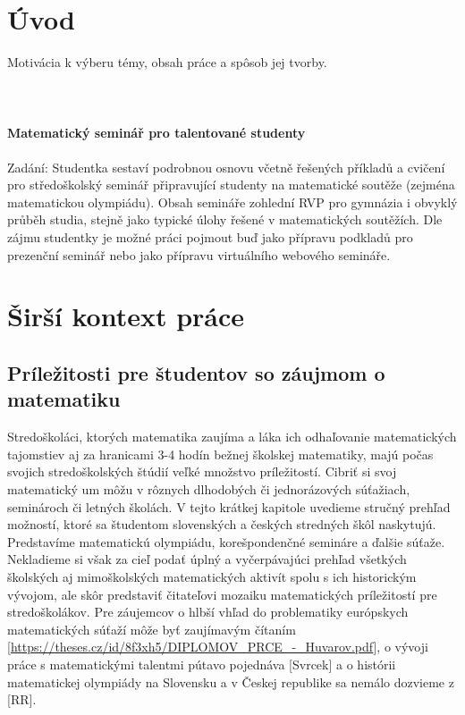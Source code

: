 \documentclass[11pt,a4paper,oneside,final]{book}
\begin{document}
\tableofcontents



\chapter*{Úvod}
\label{chap:intro}

Motivácia k výberu témy, obsah práce a spôsob jej tvorby.\\
\\
\\
\\
\textbf{Matematický seminář pro talentované studenty}\\
\\
Zadání: Studentka sestaví podrobnou osnovu včetně řešených příkladů a cvičení pro středoškolský seminář připravující studenty na matematické soutěže (zejména matematickou olympiádu). Obsah semináře zohlední RVP pro gymnázia i obvyklý průběh studia, stejně jako typické úlohy řešené v matematických soutěžích. Dle zájmu studentky je možné práci pojmout buď jako přípravu podkladů pro prezenční seminář nebo jako přípravu virtuálního webového semináře.

\chapter{Širší kontext práce}
\section{Príležitosti pre študentov so záujmom o matematiku}

Stredoškoláci, ktorých matematika zaujíma a láka ich odhaľovanie matematických tajomstiev aj za hranicami 3-4 hodín bežnej školskej matematiky, majú počas svojich stredoškolských štúdií veľké množstvo príležitostí. Cibriť si svoj matematický um môžu v rôznych dlhodobých či jednorázových súťažiach, seminároch či letných školách. V tejto krátkej kapitole uvedieme stručný prehľad možností, ktoré sa študentom slovenských a českých stredných škôl naskytujú. Predstavíme matematickú olympiádu, korešpondenčné semináre a ďalšie súťaže. Nekladieme si však za cieľ podať úplný a vyčerpávajúci prehľad všetkých školských aj mimoškolských matematických aktivít spolu s ich historickým vývojom, ale skôr predstaviť čitateľovi mozaiku matematických príležitostí pre stredoškolákov. Pre záujemcov o hlbší vhľad do problematiky európskych matematických súťaží môže byť zaujímavým čítaním [\url{https://theses.cz/id/8f3xh5/DIPLOMOV_PRCE_-_Huvarov.pdf}], o vývoji práce s matematickými talentmi pútavo pojednáva [Svrcek] a o histórii matematickej olympiády na Slovensku a v Českej republike sa nemálo dozvieme z [RR].
\end{document}
